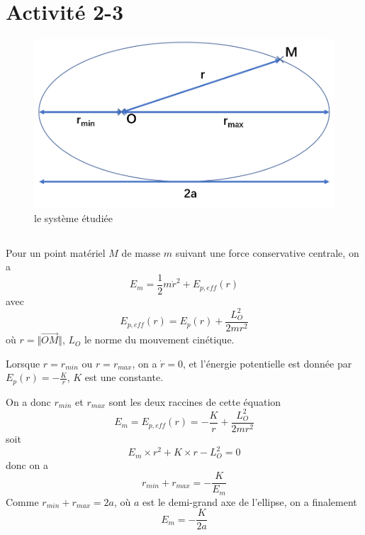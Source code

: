 \documentclass[a4paper,12pt]{book}
\begin{document}
\renewcommand{\labelitemi}{$\blacktriangleright$}
\renewcommand{\labelitemii}{$\bullet$}


\section{Activité 2-3}
\begin{figure}[h]
    \begin{center}
    \includegraphics[scale=0.6]{meca31.png}
    \end{center}
    \caption{le système étudiée}
\end{figure}
\subsection{}
Pour un point matériel $M$ de masse $m$ suivant une force conservative centrale, on a 
$$
E_m=\frac{1}{2}m\dot{r}^2+E_{p,eff}(r)
$$
avec
$$
E_{p,eff}(r)=E_p(r)+\frac{L_O^2}{2mr^2}
$$ 
où $r=\Vert\overrightarrow{OM}\Vert$, $L_O$ le norme du mouvement cinétique.

Lorsque $r=r_{min}$ ou $r=r_{max}$, on a $\dot{r}=0$, et l'énergie potentielle est donnée par $E_p(r)=-\frac{K}{r}$, $K$ est une constante. 

On a donc $r_{min}$ et $r_{max}$ sont les deux raccines de cette équation
$$
E_m=E_{p,eff}(r)=-\frac{K}{r}+\frac{L_O^2}{2mr^2}
$$
soit
$$
E_m\times r^2+K\times r-L_O^2=0
$$
donc on a 
$$
r_{min}+r_{max}=-\frac{K}{E_m}
$$
Comme $r_{min}+r_{max}=2a$, où $a$ est le demi-grand
axe de l'ellipse, on a finalement 
$$
\boxed{E_m=-\frac{K}{2a}}
$$
\end{document}
